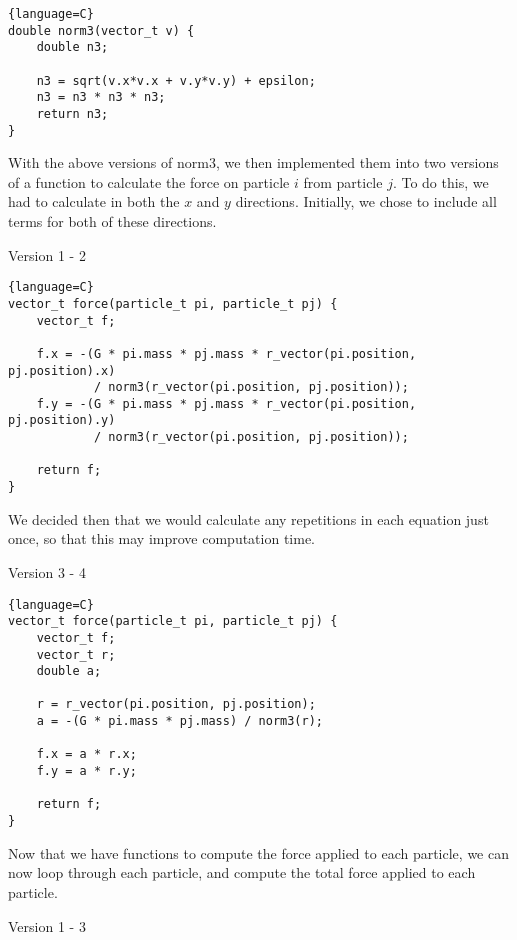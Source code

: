 \begin{lstlisting}{language=C}
double norm3(vector_t v) {
    double n3;

    n3 = sqrt(v.x*v.x + v.y*v.y) + epsilon;
    n3 = n3 * n3 * n3;
    return n3;
}
\end{lstlisting}

With the above versions of norm3, we then implemented them into two versions of a function to calculate the force on particle $i$ from particle $j$. To do this, we had to calculate in both the $x$ and $y$ directions. Initially, we chose to include all terms for both of these directions.

\begin{center}
    Version 1 - 2
\end{center}

\begin{lstlisting}{language=C}
vector_t force(particle_t pi, particle_t pj) {
    vector_t f;

    f.x = -(G * pi.mass * pj.mass * r_vector(pi.position, pj.position).x)
            / norm3(r_vector(pi.position, pj.position));
    f.y = -(G * pi.mass * pj.mass * r_vector(pi.position, pj.position).y)
            / norm3(r_vector(pi.position, pj.position));

    return f;
}
\end{lstlisting}

We decided then that we would calculate any repetitions in each equation just once, so that this may improve computation time.

\begin{center}
    Version 3 - 4
\end{center}

\begin{lstlisting}{language=C}
vector_t force(particle_t pi, particle_t pj) {
    vector_t f;
    vector_t r;
    double a;

    r = r_vector(pi.position, pj.position);
    a = -(G * pi.mass * pj.mass) / norm3(r);

    f.x = a * r.x;
    f.y = a * r.y;

    return f;
}
\end{lstlisting}

Now that we have functions to compute the force applied to each particle, we can now loop through each particle, and compute the total force applied to each particle.

\begin{center}
    Version 1 - 3
\end{center}

